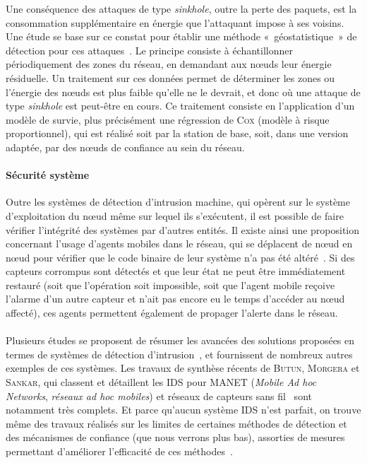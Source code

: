 Une conséquence des attaques de type \textit{sinkhole}, outre la perte des paquets, est la consommation supplémentaire en énergie que l'attaquant impose à ses voisins.
Une étude se base sur ce constat pour établir une méthode « géostatistique » de détection pour ces attaques~\cite{SKDM14}.
Le principe consiste à échantillonner périodiquement des zones du réseau, en demandant aux nœuds leur énergie résiduelle.
Un traitement sur ces données permet de déterminer les zones ou l'énergie des nœuds est plus faible qu'elle ne le devrait, et donc où une attaque de type \textit{sinkhole} est peut-être en cours.
Ce traitement consiste en l'application d'un modèle de survie, plus précisément une régression de C\textsc{ox} (modèle à risque proportionnel), qui est réalisé soit par la station de base, soit, dans une version adaptée, par des nœuds de confiance au sein du réseau.

        \paragraph{Sécurité système}
Outre les systèmes de détection d'intrusion machine, qui opèrent sur le système d'exploitation du nœud même sur lequel ils s'exécutent, il est possible de faire vérifier l'intégrité des systèmes par d'autres entités.
Il existe ainsi une proposition concernant l'usage d'agents mobiles dans le réseau, qui se déplacent de nœud en nœud pour vérifier que le code binaire de leur système n'a pas été altéré~\cite{HR13}.
Si des capteurs corrompus sont détectés et que leur état ne peut être immédiatement restauré (soit que l'opération soit impossible, soit que l'agent mobile reçoive l'alarme d'un autre capteur et n'ait pas encore eu le temps d'accéder au nœud affecté), ces agents permettent également de propager l'alerte dans le réseau.

        \paragraph{}
Plusieurs études se proposent de résumer les avancées des solutions proposées en termes de systèmes de détection d'intrusion~\cite{ME13,MS14}, et fournissent de nombreux autres exemples de ces systèmes.
Les travaux de synthèse récents de \textsc{Butun, Morgera} et \textsc{Sankar}, qui classent et détaillent les IDS pour MANET (\textit{Mobile Ad hoc Networks}, \textit{réseaux ad hoc mobiles}) et réseaux de capteurs sans fil~\cite{BMS13} sont notamment très complets.
Et parce qu'aucun système IDS n'est parfait, on trouve même des travaux réalisés sur les limites de certaines méthodes de détection et des mécanismes de confiance (que nous verrons plus bas), assorties de mesures permettant d'améliorer l'efficacité de ces méthodes~\cite{CQW12}.
